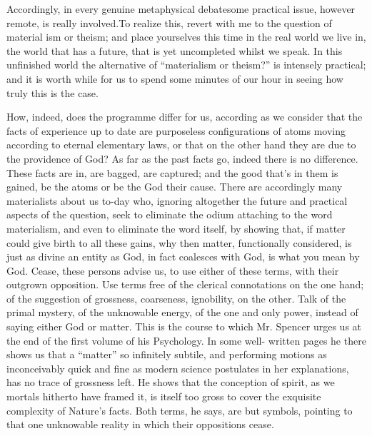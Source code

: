 \documentclass[]{article}
\begin{document}
Accordingly, in every genuine metaphysical debatesome practical issue, however remote, is really involved.To realize this, revert with me to the question of material ism or theism; and place yourselves this time in the real world we live in, the world that has a future, that is yet uncompleted whilst we speak. In this unfinished world the alternative of ``materialism or theism?'' is intensely practical; and it is worth while for us to spend some minutes of our hour in seeing how truly this is the case. 

How, indeed, does the programme differ for us, according as we consider that the facts of experience up to date are purposeless configurations of atoms moving according to eternal elementary laws, or that on the other hand they are due to the providence of God? As far as the past facts go, indeed there is no difference. These facts are in, are bagged, are captured; and the good that's in them is gained, be the atoms or be the God their cause. There are accordingly many materialists about us to-day who, ignoring altogether the future and practical aspects of the question, seek to eliminate the odium attaching to the word materialism, and even to eliminate the word itself, by showing that, if matter could give birth to all these gains, why then matter, functionally considered, is just as divine an entity as God, in fact coalesces with God, is what you mean by God. Cease, these persons advise us, to use either of these terms, with their outgrown opposition. Use terms free of the clerical connotations on the one hand; of the suggestion of grossness, coarseness, ignobility, on the other. Talk of the primal mystery, of the unknowable energy, of the one and only power, instead of saying either God or matter. This is the course to which Mr. Spencer urges us at the end of the first volume of his Psychology. In some well- written pages he there shows us that a ``matter'' so infinitely subtile, and performing motions as inconceivably quick and fine as modern science postulates in her explanations, has no trace of grossness left. He shows that the conception of spirit, as we mortals hitherto have framed it, is itself too gross to cover the exquisite complexity of Nature's facts. Both terms, he says, are but symbols, pointing to that one unknowable reality in which their oppositions cease. 
\end{document}
